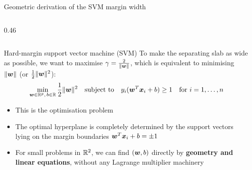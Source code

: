 \documentclass[aspectratio=169]{beamer}\usepackage[]{graphicx}\usepackage[]{xcolor}
\begin{document}
\begin{frame}{Geometric derivation of the SVM margin width}
\begin{columns}[c]
\begin{column}{0.46\textwidth}
    \end{column}
    \end{columns}
\end{frame}


\begin{frame}{Hard-margin support vector machine (SVM)}
    To make the separating slab as wide as possible, we want to maximise $\gamma = \frac{2}{\|\bm{w}\|}$, which is equivalent to minimising $\|\bm{w}\|$ (or $\frac{1}{2}\|\bm{w}\|^2$):
    \[
        \min_{\bm{w} \in \mathbb{R}^p,\, b \in \mathbb{R}} \frac{1}{2}\|\bm{w}\|^2 \quad \text{subject to} \quad y_i(\bm{w}^T \bm{x}_i + b) \ge 1 \quad \text{for } i = 1, \ldots, n
    \]
    \vfill
    \begin{itemize}
        \item This is the  optimisation problem
        \vfill
        \item The optimal hyperplane is completely determined by the support vectors lying on the margin boundaries $\bm{w}^T \bm{x}_i + b = \pm 1$
        \vfill
        \item For small problems in $\mathbb{R}^2$, we can find $(\bm{w}, b)$ directly by \textbf{geometry and linear equations}, without any Lagrange multiplier machinery
    \end{itemize}
\end{frame}
\end{document}
